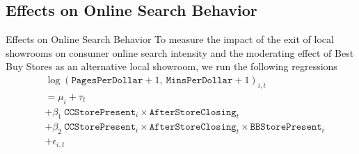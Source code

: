 \documentclass[mathserif, xcolor=table]{beamer}
\begin{document}
\subsection{Effects on Online Search Behavior}
\begin{frame}[allowframebreaks]{Effects on Online Search Behavior}
	To measure the impact of the exit of local showrooms on consumer online search intensity and the moderating effect of Best Buy Stores as an alternative local showroom, we run the following regressions
	\begin{equation}
		\begin{aligned}
			& \log\left( \texttt{PagesPerDollar} + 1,\ \texttt{MinsPerDollar} + 1\right)_{i,t} \\ &= \mu_{i} + \tau_{t} 
			\\ &+ \beta_1 \ \texttt{CCStorePresent}_i \times \texttt{AfterStoreClosing}_t 
			\\ &+ \beta_2 \ \texttt{CCStorePresent}_i \times \texttt{AfterStoreClosing}_t \times \texttt{BBStorePresent}_i \\ & + \epsilon_{i,t}
		\end{aligned}
	\end{equation}
	\framebreak
	\begin{table}[!htbp] \centering 
		\caption{Results of the Search Effect (All Product Categories)} 
		\label{tab:table5} 
\end{table}
\end{frame}
\end{document}
